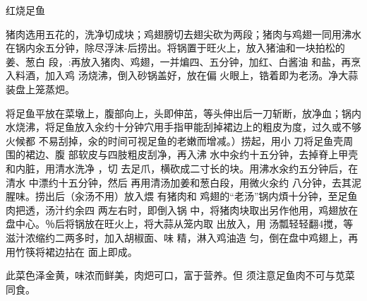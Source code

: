 \begin{recipe}{红烧足鱼}

\ingredients


\preparation

\step 猪肉选用五花的，洗净切成块；鸡翅膀切去翅尖砍为两段；猪肉与鸡翅一同用沸水
在锅内汆五分钟，除尽浮沫-后捞出。将锅置于旺火上，放入猪油和一块拍松的姜、葱白
段，:再放入猪肉、鸡翅，一并煸四、五分钟，加红、白酱油 和盐，再烹入料酒，加入鸡
汤烧沸，倒入砂锅盖好，放在偏 火眼上，锆着即为老汤。净大蒜装盘上笼蒸𤆵。

\step 将足鱼平放在菜墩上，腹部向上，头即伸茁，等头伸出后一刀斩断，放净血；锅内
水烧沸，将足鱼放入汆约十分钟穴用手指甲能刮掉裙边上的粗皮为度，过久或不够火候都
不易刮掉，汆的时间可视足鱼的老嫩而增减。）捞起，用小 刀将足鱼壳周围的裙边、腹
部软皮与四肢粗皮刮净，再入沸 水中汆约十五分钟，去掉脊上甲壳和内脏，用清水洗净
，切 去足爪，横砍成二寸长的块。用沸水汆约五分钟后，在清水 中漂约十五分钟，然后
再用清汤加姜和葱白段，用微火汆约 八分钟，去其泥腥味。捞出后（汆汤不用）放入煨
有猪肉和 鸡翅的“老汤”锅内煩十分钟，至足鱼肉把透，汤汁约余四 两左右时，即倒入锅
中，将猪肉块取出另作他用，鸡翅放在 盘中心。％后将锅放在旺火上，将大蒜从笼内取
出放入，用 汤瓢轻轻翻4搅，等滋汁浓缩约二两多时，加入胡椒面、味 精，淋入鸡油造
匀，倒在盘中鸡翅上，再用竹筷将裙边拈在 面上即成。

\features

此菜色泽金黄，味浓而鲜美，肉𤆵可口，富于营养。但 须注意足鱼肉不可与苋菜同食。

\end{recipe}

